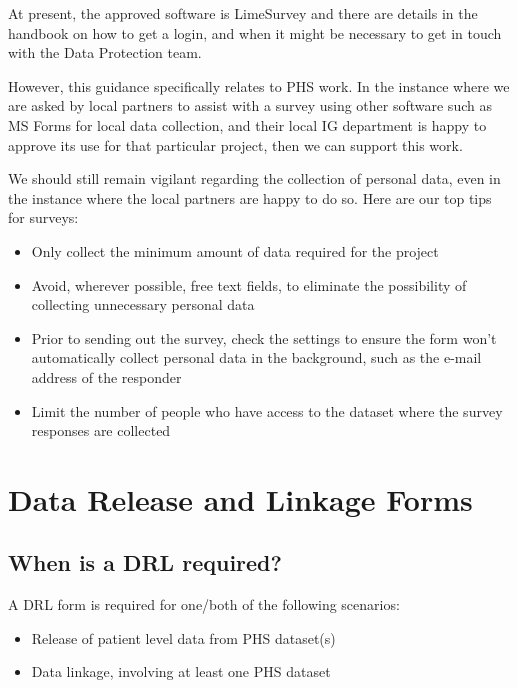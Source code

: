 \documentclass[
]{book}
\begin{document}
At present, the approved software is LimeSurvey and there are details in the handbook on how to get a login, and when it might be necessary to get in touch with the Data Protection team.

However, this guidance specifically relates to PHS work. In the instance where we are asked by local partners to assist with a survey using other software such as MS Forms for local data collection, and their local IG department is happy to approve its use for that particular project, then we can support this work.

We should still remain vigilant regarding the collection of personal data, even in the instance where the local partners are happy to do so. Here are our top tips for surveys:

\begin{itemize}
\item
  Only collect the minimum amount of data required for the project
\item
  Avoid, wherever possible, free text fields, to eliminate the possibility of collecting unnecessary personal data
\item
  Prior to sending out the survey, check the settings to ensure the form won't automatically collect personal data in the background, such as the e-mail address of the responder
\item
  Limit the number of people who have access to the dataset where the survey responses are collected
\end{itemize}

\hypertarget{data-release-and-linkage-forms}{%
\chapter{Data Release and Linkage Forms}\label{data-release-and-linkage-forms}}

\hypertarget{when-is-a-drl-required}{%
\section{When is a DRL required?}\label{when-is-a-drl-required}}

A DRL form is required for one/both of the following scenarios:

\begin{itemize}
\item
  Release of patient level data from PHS dataset(s)
\item
  Data linkage, involving at least one PHS dataset
\end{itemize}
\end{document}
